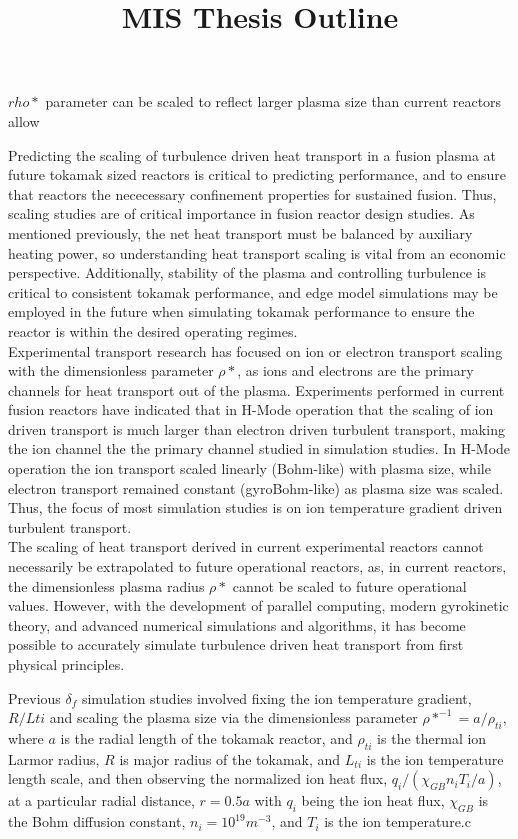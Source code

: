 \documentclass{article}
\title{ MIS Thesis Outline}
\begin{document}
$rho*$ parameter can be scaled to reflect larger plasma size than current reactors allow

Predicting the scaling of turbulence driven heat transport in a fusion plasma at future tokamak sized reactors is critical to predicting performance, and to ensure that reactors the nececessary confinement properties for sustained fusion. Thus, scaling studies are of critical importance in fusion reactor design studies. As mentioned previously, the net heat transport must be balanced by auxiliary heating power, so understanding heat transport scaling is vital from an economic perspective. Additionally, stability of the plasma and controlling turbulence is critical to consistent tokamak performance, and edge model simulations may be employed in the future when simulating tokamak performance to ensure the reactor is within the desired operating regimes. \\

Experimental transport research has focused on ion or electron transport scaling with the dimensionless parameter $\rho*$, as ions and electrons are the primary channels for heat transport out of the plasma. Experiments performed in current fusion reactors have indicated that in H-Mode operation that the scaling of ion driven transport is much larger than electron driven turbulent transport, making the ion channel the the primary channel studied in simulation studies. In H-Mode operation the ion transport scaled linearly (Bohm-like) with plasma size, while electron transport remained constant (gyroBohm-like) as plasma size was scaled. Thus, the focus of most simulation studies is on ion temperature gradient driven turbulent transport. \\

The scaling of heat transport derived in current experimental reactors cannot necessarily be extrapolated to future operational reactors, as, in current reactors, the dimensionless plasma radius $\rho*$ cannot be scaled to future operational values. However, with the development of parallel computing, modern gyrokinetic theory, and advanced numerical simulations and algorithms, it has become possible to accurately simulate turbulence driven heat transport from first physical principles.

Previous $\delta_f$ simulation studies involved fixing the ion temperature gradient, $R/L{ti}$ and scaling the plasma size via the dimensionless parameter $\rho*^{-1} = a/\rho_{ti}$, where $a$ is the radial length of the tokamak reactor, and $\rho_{ti}$ is the thermal ion Larmor radius, $R$ is major radius of the tokamak, and $L_{ti}$ is the ion temperature length scale, and then observing the normalized ion heat flux, $q_i/(\chi_{GB}n_iT_i/a)$, at a particular radial distance, $r = 0.5a$ with $q_i $ being the ion heat flux, $\chi_{GB}$ is the Bohm diffusion constant, $n_i= 10^{19}m^{-3}$, and $T_i$ is the ion temperature.c
\end{document}
